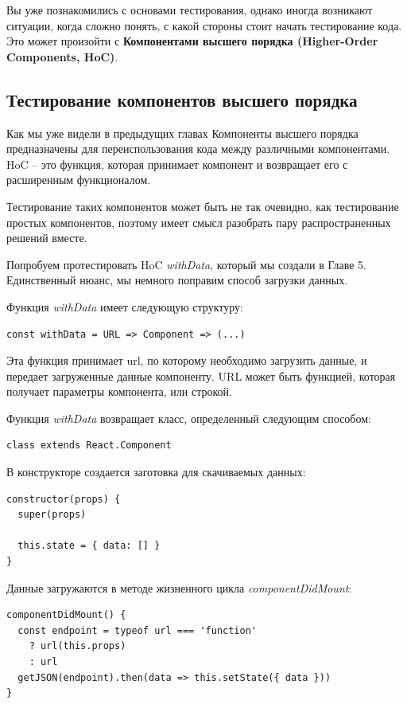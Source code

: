 Вы уже познакомились с основами тестирования, однако иногда возникают ситуации, когда сложно понять, с какой стороны стоит начать тестирование кода. Это может произойти с \textbf{Компонентами высшего порядка (Higher-Order Components, HoC)}.


\subsection{Тестирование компонентов высшего порядка}

Как мы уже видели в предыдущих главах Компоненты высшего порядка предназначены для переиспользования кода между различными компонентами. HoC -- это функция, которая принимает компонент и возвращает его с расширенным функционалом.

Тестирование таких компонентов может быть не так очевидно, как тестирование простых компонентов, поэтому имеет смысл разобрать пару распространенных решений вместе.

Попробуем протестировать HoC \textit{withData}, который мы создали в Главе 5. Единственный нюанс, мы немного поправим способ загрузки данных.

Функция \textit{withData} имеет следующую структуру:

\begin{lstlisting}
const withData = URL => Component => (...)
\end{lstlisting}

Эта функция принимает url, по которому необходимо загрузить данные, и передает загруженные данные компоненту. URL может быть функцией, которая получает параметры компонента, или строкой.

Функция \textit{withData} возвращает класс, определенный следующим способом:

\begin{lstlisting}
class extends React.Component
\end{lstlisting}

В конструкторе создается заготовка для скачиваемых данных:

\begin{lstlisting}
constructor(props) {
  super(props)
  
  this.state = { data: [] }
}
\end{lstlisting}

Данные загружаются в методе жизненного цикла \textit{componentDidMount}:

\begin{lstlisting}
componentDidMount() {
  const endpoint = typeof url === 'function'
    ? url(this.props)
    : url
  getJSON(endpoint).then(data => this.setState({ data }))
}
\end{lstlisting}

